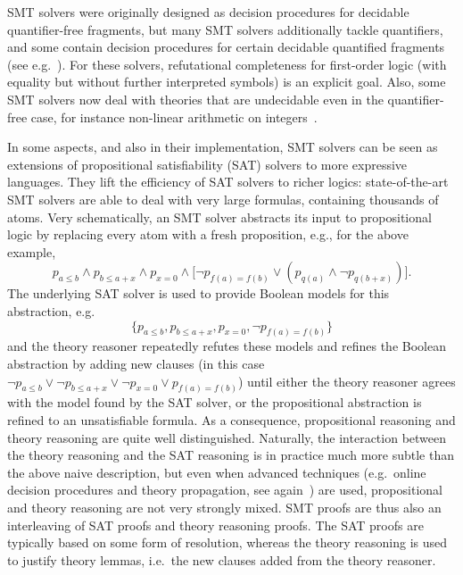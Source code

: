 \documentclass{llncs}
\begin{document}
SMT solvers were originally designed as decision procedures for
decidable quantifier-free fragments, but many SMT solvers additionally tackle
quantifiers, and some contain decision procedures for certain decidable quantified fragments
(see e.g.~\cite{Ge1,Ge2}).  For these solvers, refutational completeness for first-order logic
(with equality but without further interpreted symbols) is an explicit goal.
Also, some SMT solvers now deal with theories that are undecidable even in the
quantifier-free case, for instance non-linear arithmetic on integers~\cite{Borralleras1}.

In some aspects, and also in their implementation, SMT solvers can be seen as
extensions of propositional satisfiability (SAT) solvers to more expressive
languages.  They lift the efficiency of SAT solvers to richer logics:
state-of-the-art SMT solvers are able to deal with very large formulas,
containing thousands of atoms.  Very schematically, an SMT solver abstracts its
input to propositional logic by replacing every atom with a fresh proposition,
e.g., for the above example,
\begin{displaymath}
p_{a \leq b} \wedge p_{b \leq a + x} \wedge p_{x = 0} \wedge
 \big[ \neg p_{f(a) = f(b)} \vee (p_{q(a)} \wedge \neg p_{q(b + x)}) \big].
\end{displaymath}
The underlying SAT solver is used to provide Boolean models for this
abstraction, e.g.\
\begin{displaymath}
\{ p_{a \leq b}, p_{b \leq a + x}, p_{x = 0}, \neg p_{f(a) = f(b)} \}
\end{displaymath}
and the theory reasoner repeatedly refutes these models and refines the Boolean
abstraction by adding new clauses (in this case $\neg p_{a \leq b} \vee \neg
p_{b \leq a + x} \vee \neg p_{x = 0} \vee p_{f(a) = f(b)}$) until either the
theory reasoner agrees with the model found by the SAT solver, or the
propositional abstraction is refined to an unsatisfiable formula.  As a
consequence, propositional reasoning and theory reasoning are quite well
distinguished.  Naturally, the interaction between the theory reasoning and the
SAT reasoning is in practice much more subtle than the above naive description,
but even when advanced techniques (e.g.\ online decision procedures and theory propagation, see again~\cite{Barrett14}) are used,
propositional and theory reasoning are not very strongly mixed.  SMT proofs are
thus also an interleaving of SAT proofs and theory reasoning proofs.  The SAT
proofs are typically based on some form of resolution, whereas the theory reasoning
is used to justify theory lemmas, i.e.\ the new clauses added from the theory
reasoner.
\end{document}
